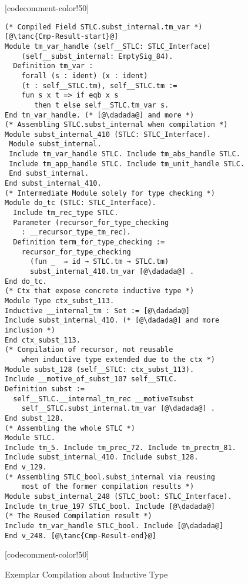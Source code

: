 \begin{figure}
\begin{minipage}{\textwidth}
\begin{multicols}{2}
[codecomment-color!50]


\columnbreak


\begin{lstlisting}
(* Compiled Field STLC.subst_internal.tm_var *) [@\tanc{Cmp-Result-start}@]
Module tm_var_handle (self__STLC: STLC_Interface)
    (self__subst_internal: EmptySig_84).
  Definition tm_var :
    forall (s : ident) (x : ident) 
    (t : self__STLC.tm), self__STLC.tm :=
    fun s x t => if eqb x s
       then t else self__STLC.tm_var s.
End tm_var_handle. (* [@\dadada@] and more *)
(* Assembling STLC.subst_internal when compilation *)
Module subst_internal_410 (STLC: STLC_Interface). 
 Module subst_internal.
 Include tm_var_handle STLC. Include tm_abs_handle STLC.
 Include tm_app_handle STLC. Include tm_unit_handle STLC.
 End subst_internal.
End subst_internal_410.
(* Intermediate Module solely for type checking *)
Module do_tc (STLC: STLC_Interface).
  Include tm_rec_type STLC.
  Parameter (recursor_for_type_checking 
    : __recursor_type_tm_rec).
  Definition term_for_type_checking :=
    recursor_for_type_checking 
      (fun _  ⇒ id → STLC.tm → STLC.tm)
      subst_internal_410.tm_var [@\dadada@] .
End do_tc.
(* Ctx that expose concrete inductive type *)
Module Type ctx_subst_113.
Inductive __internal_tm : Set := [@\dadada@] 
Include subst_internal_410. (* [@\dadada@] and more inclusion *)
End ctx_subst_113.
(* Compilation of recursor, not reusable
    when inductive type extended due to the ctx *)
Module subst_128 (self__STLC: ctx_subst_113).
Include __motive_of_subst_107 self__STLC.
Definition subst :=
  self__STLC.__internal_tm_rec __motiveTsubst
	self__STLC.subst_internal.tm_var [@\dadada@] .
End subst_128.
(* Assembling the whole STLC *)
Module STLC.
Include tm_5. Include tm_prec_72. Include tm_prectm_81.
Include subst_internal_410. Include subst_128.
End v_129.
(* Assembling STLC_bool.subst_internal via reusing 
    most of the former compilation results *)
Module subst_internal_248 (STLC_bool: STLC_Interface).
Include tm_true_197 STLC_bool. Include [@\dadada@]
(* The Reused Compilation result *)
Include tm_var_handle STLC_bool. Include [@\dadada@]
End v_248. [@\tanc{Cmp-Result-end}@]
\end{lstlisting}

[codecomment-color!50]


\end{multicols}
\end{minipage}

\caption{Exemplar Compilation about Inductive Type}\label{fig:plugin-example2}
\end{figure}